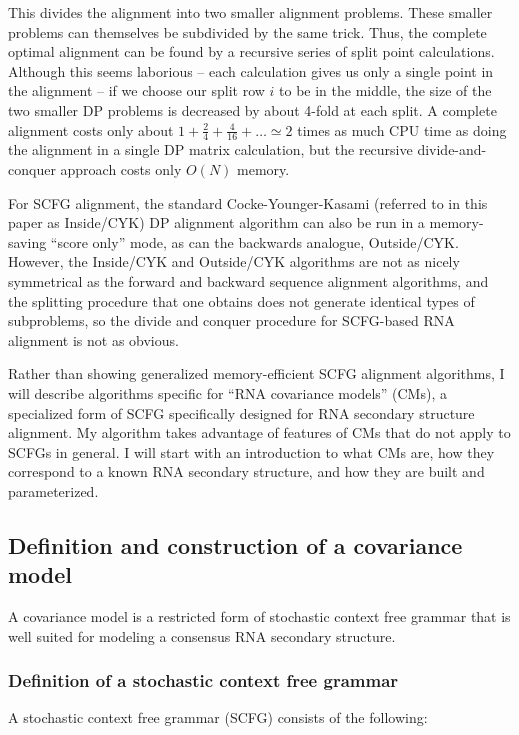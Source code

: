 \documentclass[11pt]{article}
\begin{document}
This divides the alignment into two smaller alignment problems. These
smaller problems can themselves be subdivided by the same trick.
Thus, the complete optimal alignment can be found by a recursive
series of split point calculations. Although this seems laborious --
each calculation gives us only a single point in the alignment -- if
we choose our split row $i$ to be in the middle, the size of the two
smaller DP problems is decreased by about 4-fold at each split. A
complete alignment costs only about $1 + \frac{2}{4} + \frac{4}{16} +
\ldots \simeq 2$ times as much CPU time as doing the alignment in a
single DP matrix calculation, but the recursive divide-and-conquer
approach costs only $O(N)$ memory.

For SCFG alignment, the standard Cocke-Younger-Kasami (referred to in
this paper as Inside/CYK) DP alignment algorithm can also be run in a
memory-saving ``score only'' mode, as can the backwards analogue,
Outside/CYK. However, the Inside/CYK and Outside/CYK algorithms are
not as nicely symmetrical as the forward and backward sequence
alignment algorithms, and the splitting procedure that one obtains
does not generate identical types of subproblems, so the divide and
conquer procedure for SCFG-based RNA alignment is not as obvious.

Rather than showing generalized memory-efficient SCFG alignment
algorithms, I will describe algorithms specific for ``RNA covariance
models'' (CMs), a specialized form of SCFG specifically designed for
RNA secondary structure alignment. My algorithm takes advantage of
features of CMs that do not apply to SCFGs in general. I will start
with an introduction to what CMs are, how they correspond to a known
RNA secondary structure, and how they are built and parameterized.
      
\subsection{Definition and construction of a covariance model}

A covariance model is a restricted form of stochastic context free
grammar that is well suited for modeling a consensus RNA secondary
structure.

\subsubsection{Definition of a stochastic context free grammar}

A stochastic context free grammar (SCFG) consists of the following:
\end{document}
